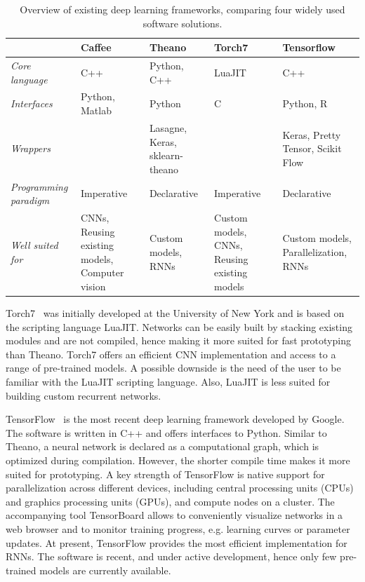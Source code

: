 \begin{table}
\centering
\begin{tabular}{p{2.5cm}|p{2.6cm}|p{2.6cm}|p{2.6cm}|p{2.6cm}}
\toprule
& \textbf{Caffee} & \textbf{Theano} & \textbf{Torch7} & \textbf{Tensorflow} \\
\hline
\textit{Core language} & C++ & Python, C++ & LuaJIT  & C++\\
\hline
\textit{Interfaces} & Python, Matlab & Python & C & Python, R \\
\hline
\textit{Wrappers} & & Lasagne, Keras, sklearn-theano & & Keras, Pretty Tensor, Scikit Flow \\
\hline
\textit{Programming paradigm} & Imperative & Declarative & Imperative & Declarative \\
\hline
\textit{Well suited for} & CNNs, Reusing existing models, Computer vision & Custom models, RNNs & Custom models, CNNs, Reusing existing models & Custom models, Parallelization, RNNs \\
\bottomrule
\end{tabular}
\caption{Overview of existing deep learning frameworks, comparing four widely used software solutions.}
\label{tab:dl_tools}
\end{table}

Torch7~\citep{collobert_torch7:_2011} was initially developed at the University of New York and is based on the scripting language LuaJIT. Networks can be easily built by stacking existing modules and are not compiled, hence making it more suited for fast prototyping than Theano. Torch7 offers an efficient CNN implementation and access to a range of pre-trained models. A possible downside is the need of the user to be familiar with the LuaJIT scripting language. Also, LuaJIT is less suited for building custom recurrent networks.

TensorFlow~\citep{abadi_tensorflow:_2016} is the most recent deep learning framework developed by Google. The software is written in C++ and offers interfaces to Python. Similar to Theano, a neural network is declared as a computational graph, which is optimized during compilation. However, the shorter compile time makes it more suited for prototyping. A key strength of TensorFlow is native support for parallelization across different devices, including central processing units (CPUs) and graphics processing units (GPUs), and compute nodes on a cluster. The accompanying tool TensorBoard allows to conveniently visualize networks in a web browser and to monitor training progress, e.g. learning curves or parameter updates. At present, TensorFlow provides the most efficient implementation for RNNs. The software is recent, and under active development, hence only few pre-trained models are currently available.


